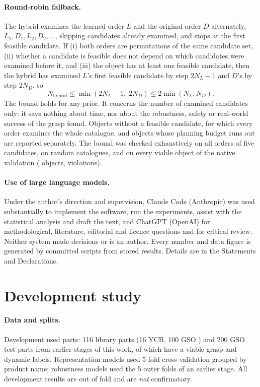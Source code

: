 \documentclass[pdflatex,sn-mathphys-num,iicol]{sn-jnl}
\begin{document}
\paragraph{Round-robin fallback.} The hybrid examines the learned order $L$ and the original order $D$ alternately, $L_1, D_1, L_2, D_2,\dots$, skipping candidates already examined, and stops at the first feasible candidate. If (i) both orders are permutations of the same candidate set, (ii) whether a candidate is feasible does not depend on which candidates were examined before it, and (iii) the object has at least one feasible candidate, then the hybrid has examined $L$'s first feasible candidate by step $2N_L-1$ and $D$'s by step $2N_D$, so
\begin{equation}
N_{\text{hybrid}} \le \min(2N_L-1,\; 2N_D) \le 2\min(N_L, N_D).
\end{equation}
The bound holds for any prior. It concerns the number of examined candidates only: it says nothing about time, nor about the robustness, safety or real-world success of the grasp found. Objects without a feasible candidate, for which every order examines the whole catalogue, and objects whose planning budget runs out are reported separately. The bound was checked exhaustively on all orders of five candidates, on random catalogues, and on every viable object of the native validation (\fbObjects{} objects, \fbViolations{} violations).

\paragraph{Use of large language models.} Under the author's direction and supervision, Claude Code (Anthropic) was used substantially to implement the software, run the experiments, assist with the statistical analysis and draft the text, and ChatGPT (OpenAI) for methodological, literature, editorial and licence questions and for critical review. Neither system made decisions or is an author. Every number and data figure is generated by committed scripts from stored results. Details are in the Statements and Declarations.

\section{Development study}\label{sec:dev}

\paragraph{Data and splits.} Development used \devAllParts{} parts: 116 library parts (16 YCB, 100 GSO \cite{downs2022gso}) and 200 GSO test parts from earlier stages of this work, of which \devParts{} have a viable grasp and dynamic labels. Representation models used 5-fold cross-validation grouped by product name; robustness models used the 5 outer folds of an earlier stage. All development results are out of fold and are \emph{not} confirmatory.
\end{document}

